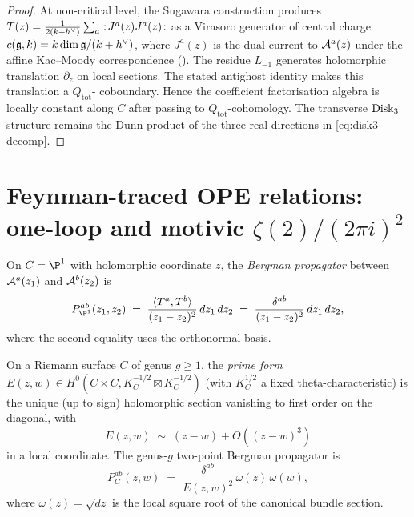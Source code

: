 \begin{proof}
At non-critical level, the Sugawara construction produces
$T(z) = \tfrac{1}{2(k+h^\vee)}\sum_a:\!J^a(z)J^a(z)\!:$ as a
Virasoro generator of central charge
$c(\mathfrak{g},k) = k\dim\mathfrak{g}/(k+h^\vee)$, where $J^a(z)$ is the dual current
to $\mathcal{A}^a(z)$ under the affine Kac--Moody correspondence
(\cite[Prop.\,5.1]{FrenkelBenZvi2004}). The residue $L_{-1}$ generates
holomorphic translation $\partial_z$ on local sections. The stated
antighost identity makes this translation a $Q_{\mathrm{tot}}$-
coboundary. Hence the coefficient factorisation algebra is locally
constant along $C$ after passing to $Q_{\mathrm{tot}}$-cohomology. The
transverse $\mathrm{Disk}_3$ structure remains the Dunn product of the three
real directions in \eqref{eq:disk3-decomp}.
\end{proof}

\section{Feynman-traced OPE relations: one-loop and motivic
$\zeta(2)/(2\pi i)^2$}
\label{sec:ch-ce-ope-one-loop}

\begin{definition}
\label{def:bergman-genus-zero}
%
On $C = \P^1$ with holomorphic coordinate $z$, the \emph{Bergman
propagator} between $\mathcal{A}^a(z_1)$ and $\mathcal{A}^b(z_2)$ is
\begin{equation}
\label{eq:bergman-p1}
P^{ab}_{\P^1}(z_1,z_2)
\;=\;
\frac{\langle T^a,T^b\rangle}{(z_1-z_2)^2}\,dz_1\,dz_2
\;=\;
\frac{\delta^{ab}}{(z_1-z_2)^2}\,dz_1\,dz_2,
\end{equation}
where the second equality uses the orthonormal basis.
\end{definition}

\begin{definition}
\label{def:prime-form}
%
On a Riemann surface $C$ of genus $g\ge 1$, the \emph{prime form}
$E(z,w)\in H^0(C\times C,K_C^{-1/2}\boxtimes K_C^{-1/2})$ (with
$K_C^{1/2}$ a fixed theta-characteristic) is the unique
(up to sign) holomorphic section vanishing to first order on the
diagonal, with
\begin{equation}
E(z,w) \;\sim\; (z-w) + O((z-w)^3)
\end{equation}
in a local coordinate. The genus-$g$ two-point Bergman propagator is
\begin{equation}
\label{eq:bergman-genus-g}
P^{ab}_{C}(z,w)
\;=\;
\frac{\delta^{ab}}{E(z,w)^2}\,
\omega(z)\,\omega(w),
\end{equation}
where $\omega(z) = \sqrt{dz}$ is the local square root of the
canonical bundle section.
\end{definition}

